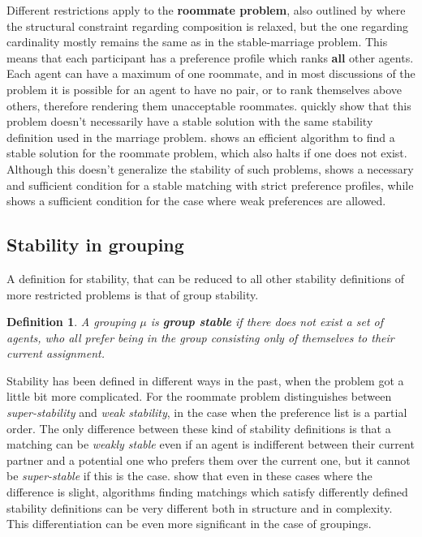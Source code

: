 \documentclass{elsarticle}
\newtheorem{mydef}{Definition}
\begin{document}
Different restrictions apply to the \textbf{roommate problem}, also outlined by \cite{galeshapley62} where the structural constraint regarding composition is relaxed, but the one regarding cardinality mostly remains the same as in the stable-marriage problem. This means that each participant has a preference profile which ranks \textbf{all} other agents. Each agent can have a maximum of one roommate, and in most discussions of the problem it is possible for an agent to have no pair, or to rank themselves above others, therefore rendering them unacceptable roommates. \cite{galeshapley62} quickly show that this problem doesn't necessarily have a stable solution with the same stability definition used in the marriage problem. \cite{irving85} shows an efficient algorithm to find a stable solution for the roommate problem, which also halts if one does not exist. Although this doesn't generalize the stability of such problems, \cite{tan91} shows a necessary and sufficient condition for a stable matching with strict preference profiles, while \cite{chung00} shows a sufficient condition for the case where weak preferences are allowed.

\subsection{Stability in grouping}

A definition for stability, that can be reduced to all other stability definitions of more restricted problems is that of group stability.

\begin{mydef}
A grouping $\mu$ is \textbf{group stable} if there does not exist a set of agents, who all prefer being in the group consisting only of themselves to their current assignment.
\end{mydef}

Stability has been defined in different ways in the past, when the problem got a little bit more complicated. For the roommate problem \cite{irving94sta} distinguishes between \textit{super-stability} and \textit{weak stability}, in the case when the preference list is a partial order. The only difference between these kind of stability definitions is that a matching can be \textit{weakly stable} even if an agent is indifferent between their current partner and a potential one who prefers them over the current one, but it cannot be \textit{super-stable} if this is the case. \cite{irving02} show that even in these cases where the difference is slight, algorithms finding matchings which satisfy differently defined stability definitions can be very different both in structure and in complexity. This differentiation can be even more significant in the case of groupings.
\end{document}

